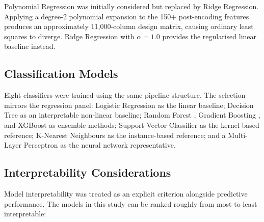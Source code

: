 \documentclass[11pt,a4paper]{article}
\begin{document}
Polynomial Regression was initially considered but replaced by Ridge
Regression. Applying a degree-2 polynomial expansion to the 150+
post-encoding features produces an approximately 11,000-column design
matrix, causing ordinary least squares to diverge. Ridge Regression
\autocite{Hoerl1970} with \(\alpha = 1.0\) provides the regularised
linear baseline instead.

\subsection{Classification Models}\label{classification-models}

Eight classifiers were trained using the same pipeline structure. The
selection mirrors the regression panel: Logistic Regression as the
linear baseline; Decision Tree as an interpretable non-linear baseline;
Random Forest \autocite{Breiman2001}, Gradient Boosting
\autocite{Friedman2001}, and XGBoost \autocite{ChenGuestrin2016} as
ensemble methods; Support Vector Classifier \autocite{Cortes1995} as the
kernel-based reference; K-Nearest Neighbours as the instance-based
reference; and a Multi-Layer Perceptron as the neural network
representative.

\subsection{Interpretability
Considerations}\label{interpretability-considerations}

Model interpretability was treated as an explicit criterion alongside
predictive performance. The models in this study can be ranked roughly
from most to least interpretable:
\end{document}

